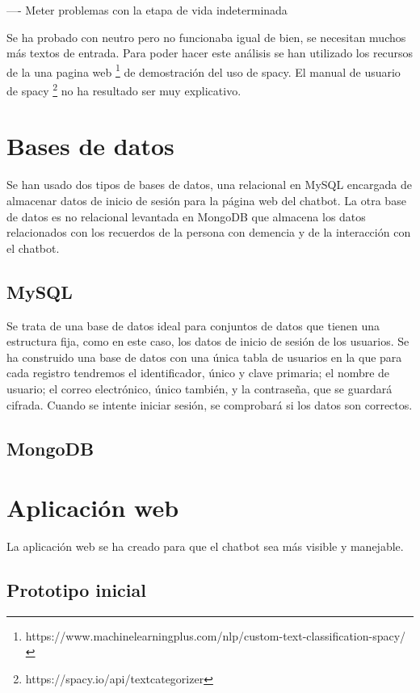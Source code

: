 ---- Meter problemas con la etapa de vida indeterminada 

Se ha probado con neutro pero no funcionaba igual de bien, se necesitan muchos más textos de entrada. Para poder hacer este análisis se han utilizado los recursos de la una pagina web \footnote{https://www.machinelearningplus.com/nlp/custom-text-classification-spacy/} de demostración del uso de spacy. El manual de usuario de spacy \footnote{https://spacy.io/api/textcategorizer} no ha resultado ser muy explicativo.

\section{Bases de datos}

Se han usado dos tipos de bases de datos, una relacional en MySQL encargada de almacenar datos de inicio de sesión para la página web del chatbot. La otra base de datos es no relacional levantada en MongoDB que almacena los datos relacionados con los recuerdos de la persona con demencia y de la interacción con el chatbot. 

\subsection{MySQL}

Se trata de una base de datos ideal para conjuntos de datos que tienen una estructura fija, como en este caso, los datos de inicio de sesión de los usuarios. Se ha construido una base de datos con una única tabla de usuarios en la que para cada registro tendremos el identificador, único y clave primaria; el nombre de usuario; el correo electrónico, único también, y la contraseña, que se guardará cifrada. Cuando se intente iniciar sesión, se comprobará si los datos son correctos. 

\subsection{MongoDB}


\section{Aplicación web}

La aplicación web se ha creado para que el chatbot sea más visible y manejable.

\subsection{Prototipo inicial}

